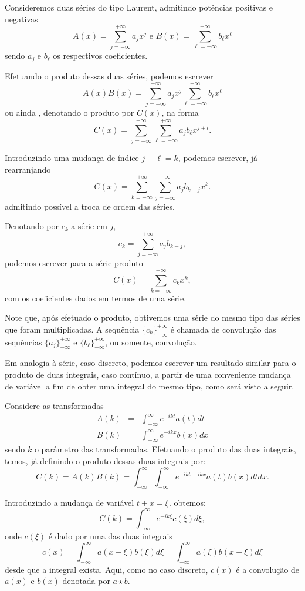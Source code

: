 Consideremos duas séries do tipo Laurent, admitindo potências positivas e negativas
$$A(x)
= \sum_{j=-\infty}^{+\infty} a_j x^j
\mbox{ e }
B(x)
= \sum_{\ell=-\infty}^{+\infty} b_\ell x^\ell
$$
sendo $a_j$ e $b_\ell$ os respectivos coeficientes.

Efetuando o produto dessas duas séries, podemos escrever
$$A(x) B(x) = \sum_{j=-\infty}^{+\infty} a_j x^j \sum_{\ell=-\infty}^{+\infty} b_\ell x^\ell$$
ou ainda , denotando o produto por $C(x)$, na forma
$$C(x) = \sum_{j=-\infty}^{+\infty}\sum_{\ell=-\infty}^{+\infty} a_j b_\ell x^{j+l}.$$

Introduzindo uma mudança de índice $j+\ell = k$, podemos escrever, já rearranjando
$$C(x) = \sum_{k=-\infty}^{+\infty}\sum_{j=-\infty}^{+\infty}
a_j b_{k-j} x^k.$$
admitindo possível a troca de ordem das séries.

Denotando por $c_k$ a série em $j$,
$$c_k = \sum_{j=-\infty}^{+\infty} a_j b_{k-j},$$
podemos escrever para a série produto
$$C(x) = \sum_{k=-\infty}^{+\infty}
c_k x^k,$$
com os coeficientes dados em termos de uma série.

Note que, após efetuado o produto, obtivemos uma série do mesmo tipo das séries que foram multiplicadas. A sequência $\{c_k\}_{-\infty}^{+\infty}$ é chamada de convolução das sequências $\{a_j\}_{-\infty}^{+\infty}$ e $\{b_\ell\}_{-\infty}^{+\infty}$, ou somente, convolução.

Em analogia à série, caso discreto, podemos escrever um resultado similar para o produto de duas integrais, caso contínuo, a partir de uma conveniente mudança de variável a fim de obter uma integral do mesmo tipo, como será visto a seguir.

Considere as transformadas
$$\begin{array}{rcl}\displaystyle
A(k)
&=&
\int_{-\infty}^{\infty}
e^{-ikt} a(t) dt \\
B(k)
&=&
\int_{-\infty}^{\infty}
e^{-ikx} b(x) dx
\end{array}$$
sendo $k$ o parâmetro das transformadas. Efetuando o produto das duas integrais, temos, já definindo o produto dessas duas integrais por:
$$C(k) = A(k)B(k) =
\int_{-\infty}^{\infty}
\int_{-\infty}^{\infty}
e^{-ikt-ikx} a(t) b(x) dt dx.
$$

Introduzindo a mudança de variável $t + x = \xi$. obtemos:
$$
C(k)
=\int_{-\infty}^{\infty}
e^{-ik\xi} c(\xi) d\xi,$$ 
onde $c(\xi)$ é dado por uma das duas integrais
$$
c(x)
=
\int_{-\infty}^{\infty}
a(x-\xi) b(\xi) d\xi
=
\int_{-\infty}^{\infty}
a(\xi) b(x-\xi) d\xi
$$
desde que a integral exista. Aqui, como no caso discreto, $c(x)$ é a convolução de $a(x)$ e $b(x)$ denotada por $a \star b$.

